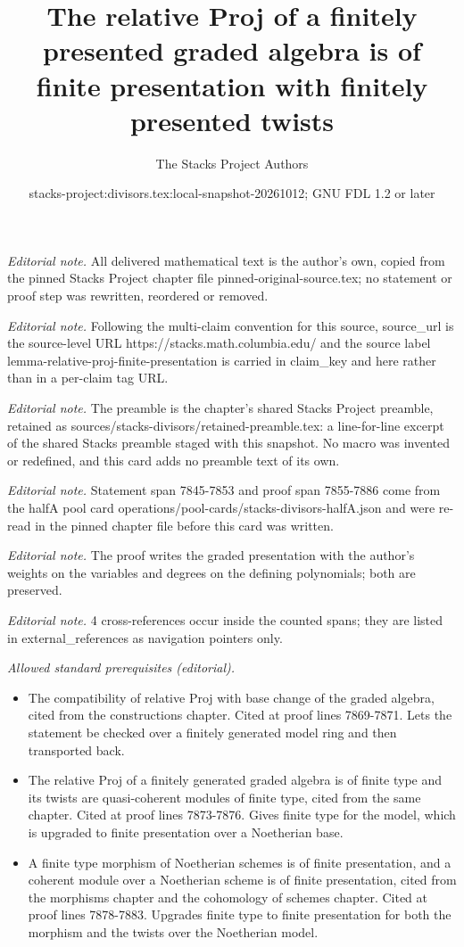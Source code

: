 \documentclass[10pt,a4paper]{amsart}
\title{The relative Proj of a finitely presented graded algebra is of finite presentation with finitely presented twists}
\author{The Stacks Project Authors}
\date{stacks-project:divisors.tex:local-snapshot-20261012; GNU FDL 1.2 or later}
\theoremstyle{plain}
\theoremstyle{definition}
\theoremstyle{remark}
\numberwithin{equation}{subsection}
\begin{document}
\maketitle
\noindent\textit{Editorial note.} All delivered mathematical text is the author's own, copied from the pinned Stacks Project chapter file pinned-original-source.tex; no statement or proof step was rewritten, reordered or removed.\par\medskip
\noindent\textit{Editorial note.} Following the multi-claim convention for this source, source\_url is the source-level URL https://stacks.math.columbia.edu/ and the source label lemma-relative-proj-finite-presentation is carried in claim\_key and here rather than in a per-claim tag URL.\par\medskip
\noindent\textit{Editorial note.} The preamble is the chapter's shared Stacks Project preamble, retained as sources/stacks-divisors/retained-preamble.tex: a line-for-line excerpt of the shared Stacks preamble staged with this snapshot. No macro was invented or redefined, and this card adds no preamble text of its own.\par\medskip
\noindent\textit{Editorial note.} Statement span 7845-7853 and proof span 7855-7886 come from the halfA pool card operations/pool-cards/stacks-divisors-halfA.json and were re-read in the pinned chapter file before this card was written.\par\medskip
\noindent\textit{Editorial note.} The proof writes the graded presentation with the author's weights on the variables and degrees on the defining polynomials; both are preserved.\par\medskip
\noindent\textit{Editorial note.} 4 cross-references occur inside the counted spans; they are listed in external\_references as navigation pointers only.\par\medskip
\noindent\textit{Allowed standard prerequisites (editorial).}\begin{itemize}
\item The compatibility of relative Proj with base change of the graded algebra, cited from the constructions chapter. Cited at proof lines 7869-7871. Lets the statement be checked over a finitely generated model ring and then transported back.
\item The relative Proj of a finitely generated graded algebra is of finite type and its twists are quasi-coherent modules of finite type, cited from the same chapter. Cited at proof lines 7873-7876. Gives finite type for the model, which is upgraded to finite presentation over a Noetherian base.
\item A finite type morphism of Noetherian schemes is of finite presentation, and a coherent module over a Noetherian scheme is of finite presentation, cited from the morphisms chapter and the cohomology of schemes chapter. Cited at proof lines 7878-7883. Upgrades finite type to finite presentation for both the morphism and the twists over the Noetherian model.
\end{itemize}\medskip
\end{document}

